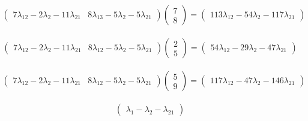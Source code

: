 \documentclass[12pt]{report}
\begin{document}
\begin{equation}
	\begin{aligned}
		\begin{pmatrix}7\lambda_{12}-2\lambda_{2}-11\lambda_{21} & 8\lambda_{13}-5\lambda_{2}-5\lambda_{21}\end{pmatrix}\begin{pmatrix}7 \\ 8\end{pmatrix}=\begin{pmatrix}113\lambda_{12}-54\lambda_{2}-117\lambda_{21}\end{pmatrix}
	\end{aligned}
\end{equation}

\begin{equation}
	\begin{aligned}
		\begin{pmatrix}7\lambda_{12}-2\lambda_{2}-11\lambda_{21} & 8\lambda_{12}-5\lambda_{2}-5\lambda_{21}\end{pmatrix}\begin{pmatrix}2 \\ 5\end{pmatrix}=\begin{pmatrix}54\lambda_{12}-29\lambda_{2}-47\lambda_{21}\end{pmatrix}
	\end{aligned}
\end{equation}

\begin{equation}
	\begin{aligned}
		\begin{pmatrix}7\lambda_{12}-2\lambda_{2}-11\lambda_{21} & 8\lambda_{12}-5\lambda_{2}-5\lambda_{21}\end{pmatrix}\begin{pmatrix}5 \\ 9\end{pmatrix}=\begin{pmatrix}117\lambda_{12}-47\lambda_{2}-146\lambda_{21}\end{pmatrix}
	\end{aligned}
\end{equation}

\begin{equation}
	\begin{aligned}
		\begin{pmatrix}\lambda_{1}-\lambda_{2}-\lambda_{21}\end{pmatrix}
	\end{aligned}
\end{equation}
\end{document}

